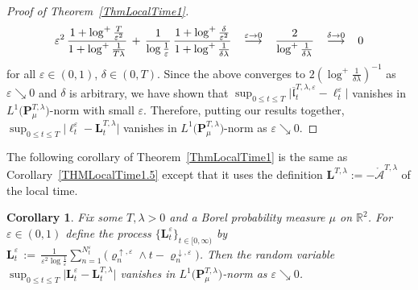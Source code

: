\documentclass[10pt]{article}
\def\stackrel#1#2{\mathrel{\mathop{#2}\limits^{#1}}}
\numberwithin{equation}{section}
\newtheorem{corollary}[theorem]{Corollary}
\theoremstyle{definition}
\newcommand{\R}{{\mathbb R}}
\begin{document}
\begin{proof}[Proof of Theorem~\ref{ThmLocalTime1}]
$$ \varepsilon^2\,\frac{ 1+\log^+\frac{T}{\varepsilon^2 }  }{1+\log^+ \frac{1}{T\lambda} }
\, +\,\frac{1}{\log \frac{1}{\varepsilon}  }\,\frac{ 1+\log^+\frac{\delta}{\varepsilon^2 }  }{1+\log^+ \frac{1}{\delta\lambda} }  \hspace{.3cm}  \stackrel{\varepsilon\rightarrow 0  }{\longrightarrow  } \hspace{.3cm} \frac{2}{\log^+ \frac{ 1}{\delta \lambda } } \hspace{.3cm}  \stackrel{\delta\rightarrow 0  }{\longrightarrow  } \hspace{.3cm} 0
 $$
for all $\varepsilon\in (0,1)$, $\delta\in (0,T)$. Since the above converges to $ 2 (\log^+ \frac{ 1}{\delta \lambda } )^{-1}$ as $\varepsilon \searrow 0$ and  $\delta$ is arbitrary, we have shown that  $\sup_{0\leq t\leq T}\big|\overline{\mathfrak{l}}_t^{T,\lambda,\varepsilon}-\ell_{t}^{\varepsilon}\big|$ vanishes in $L^1\big( \mathbf{P}_{\mu}^{T,\lambda}\big)$-norm with small $\varepsilon$.    Therefore, putting our results together,  $\sup_{0\leq t\leq T}\big|\ell_{t}^{\varepsilon} -\mathbf{L}_{t}^{T,\lambda}\big|$ vanishes in $L^1\big( \mathbf{P}_{\mu}^{T,\lambda} \big)$-norm as $\varepsilon \searrow 0$.
\end{proof}

The following corollary of Theorem~\ref{ThmLocalTime1} is the same as Corollary~\ref{THMLocalTime1.5} except that it uses the definition $\mathbf{L}^{T,\lambda} :=-\mathring{\mathcal{A}}^{T,\lambda}$ of the local time.
\begin{corollary}\label{ThmLocalTime2} Fix some $T,\lambda >0$ and a  Borel probability measure $\mu$  on $\R^2$. For $\varepsilon\in (0,1)$
  define the process   $\{\mathbf{L}_{t}^{\varepsilon}\}_{t\in [0,\infty)}$ by $ \mathbf{L}_{t}^{\varepsilon}\,:=\,\frac{1 }{ \varepsilon^2 \log \frac{1}{\varepsilon} }\sum_{n=1}^{N_{t}^{\varepsilon}} \big(\varrho_{n}^{\uparrow,\varepsilon}\wedge t-\varrho_{n}^{\downarrow ,\varepsilon}\big) $.    
Then the random variable
 $\sup_{0\leq t\leq T}\big| \mathbf{L}_{t}^{\varepsilon}-\mathbf{L}_{t}^{T,\lambda}\big|$ vanishes  in $L^1\big(\mathbf{P}_{\mu}^{T,\lambda}\big)$-norm as $\varepsilon \searrow 0$.  
\end{corollary}
\end{document}
